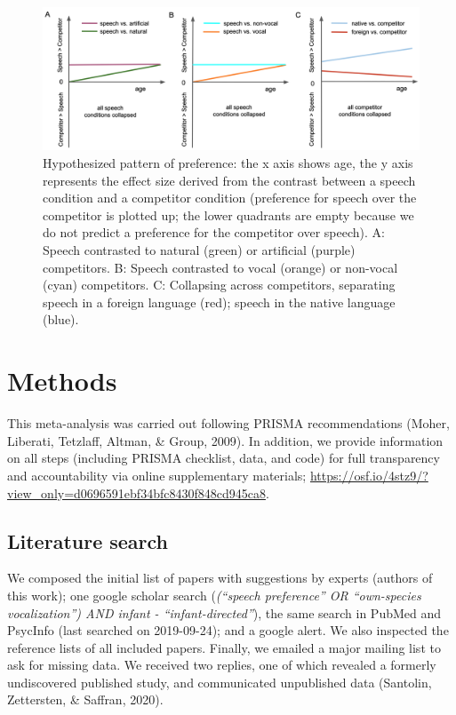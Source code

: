 \documentclass[
  english,
  man]{apa6}
\begin{document}
\begin{figure}
\includegraphics[width=6.63in]{figures_intro/hypotheses} \caption{Hypothesized pattern of preference: the x axis shows age, the y axis represents the effect size derived from the contrast between a speech condition and a competitor condition (preference for speech over the competitor is plotted up; the lower quadrants are empty because we do not predict a preference for the competitor over speech). A: Speech contrasted to natural (green) or artificial (purple) competitors. B: Speech contrasted to vocal (orange) or non-vocal (cyan) competitors. C: Collapsing across competitors, separating speech in a foreign language (red); speech in the native language (blue).}\label{fig:hyp}
\end{figure}

\hypertarget{methods}{%
\section{Methods}\label{methods}}

This meta-analysis was carried out following PRISMA recommendations (Moher, Liberati, Tetzlaff, Altman, \& Group, 2009). In addition, we provide information on all steps (including PRISMA checklist, data, and code) for full transparency and accountability via online supplementary materials; \url{https://osf.io/4stz9/?view_only=d0696591ebf34bfc8430f848cd945ca8}.

\hypertarget{literature-search}{%
\subsection{Literature search}\label{literature-search}}

We composed the initial list of papers with suggestions by experts (authors of this work); one google scholar search (\emph{(``speech preference'' OR ``own-species vocalization'') AND infant - ``infant-directed''}), the same search in PubMed and PsycInfo (last searched on 2019-09-24); and a google alert. We also inspected the reference lists of all included papers. Finally, we emailed a major mailing list to ask for missing data. We received two replies, one of which revealed a formerly undiscovered published study, and communicated unpublished data (Santolin, Zettersten, \& Saffran, 2020).
\end{document}
